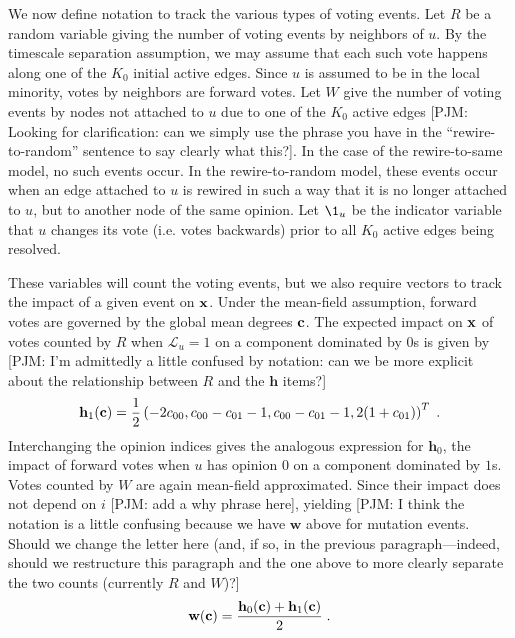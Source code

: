 \documentclass[review, onefignum, onetabnum]{siamart171218}
\newcommand{\pjm}[1]{{\color{blue}[PJM: #1]}}
\begin{document}
		We now define notation to track the various types of voting events. 
		Let $R$ be a random variable giving the number of voting events by neighbors of $u$. 
		By the timescale separation assumption, we may assume that each such vote happens along one of the $K_0$ initial active edges. 
		Since $u$ is assumed to be in the local minority, votes by neighbors are forward votes. 
		Let $W$ give the number of voting events by nodes not attached to $u$ due to one of the $K_0$ active edges \pjm{Looking for clarification: can we simply use the phrase you have in the ``rewire-to-random'' sentence to say clearly what this?}. 
		In the case of the rewire-to-same model, no such events occur. 
		In the rewire-to-random model, these events occur when an edge attached to $u$ is rewired in such a way that it is no longer attached to $u$, but to another node of the same opinion. 
		Let $\1_u$ be the indicator variable that $u$ changes its vote (i.e. votes backwards) prior to all $K_0$ active edges being resolved. 

		These variables will count the voting events, but we also require vectors to track the impact of a given event on $\mathbf{x}$. 
		Under the mean-field assumption, forward votes are governed by the global mean degrees $\mathbf{c}$. 
		The expected impact on $\mathbf{x}$ of votes counted by $R$ when $\mathcal{L}_u = 1$ on a component dominated by $0$s is given by \pjm{I'm admittedly a little confused by notation: can we be more explicit about the relationship between $R$ and the $\mathbf{h}$ items?}
		\begin{align}
			\mathbf{h}_1(\mathbf{c}) = \frac{1}{2}\left(-2c_{00} , c_{00} - c_{01} - 1, c_{00} - c_{01} - 1, 2(1+c_{01})\right)^T\;.
		\end{align}
		Interchanging the opinion indices gives the analogous expression for $\mathbf{h}_0$, the impact of forward votes when $u$ has opinion $0$ on a component dominated by $1$s. 
		Votes counted by $W$ are again mean-field approximated. Since their impact does not depend on $i$ \pjm{add a why phrase here}, yielding \pjm{I think the notation is a little confusing because we have $\mathbf{w}$ above for mutation events. Should we change the letter here (and, if so, in the previous paragraph---indeed, should we restructure this paragraph and the one above to more clearly separate the two counts (currently $R$ and $W$)?}
		\begin{align}
			\mathbf{w}(\mathbf{c}) = \frac{\mathbf{h}_0(\mathbf{c}) + \mathbf{h}_1(\mathbf{c})}{2}\;.
		\end{align}
\end{document}
